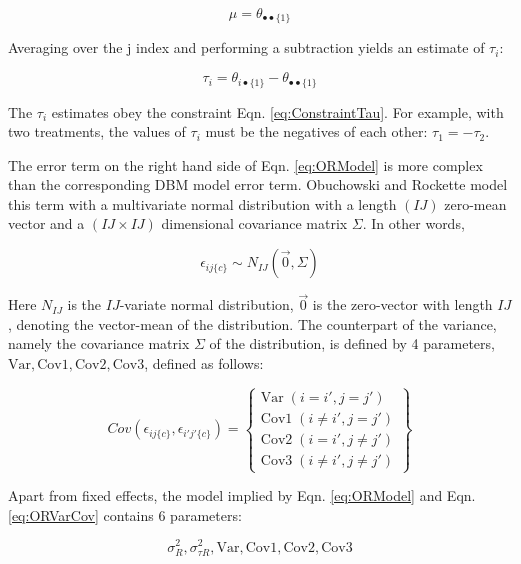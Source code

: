 \documentclass[
]{book}
\begin{document}
\begin{equation}
\mu = \theta_{\bullet \bullet \{1\}}
\label{eq:ORmuEstimate}
\end{equation}

Averaging over the j index and performing a subtraction yields an estimate of \(\tau_i\):

\begin{equation}
\tau_i = \theta_{i \bullet \{1\}} - \theta_{\bullet \bullet \{1\}}
\label{eq:ORtauEstimate}
\end{equation}

The \(\tau_i\) estimates obey the constraint Eqn. \eqref{eq:ConstraintTau}. For example, with two treatments, the values of \(\tau_i\) must be the negatives of each other: \(\tau_1=-\tau_2\).

The error term on the right hand side of Eqn. \eqref{eq:ORModel} is more complex than the corresponding DBM model error term. Obuchowski and Rockette model this term with a multivariate normal distribution with a length \((IJ)\) zero-mean vector and a \((IJ \times IJ)\) dimensional covariance matrix \(\Sigma\). In other words,

\begin{equation}
\epsilon_{ij\{c\}} \sim N_{IJ}(\vec{0},\Sigma)
\label{eq:OREpsSampling}
\end{equation}

Here \(N_{IJ}\) is the \(IJ\)-variate normal distribution, \(\vec{0}\) is the zero-vector with length \(IJ\), denoting the vector-mean of the distribution. The counterpart of the variance, namely the covariance matrix \(\Sigma\) of the distribution, is defined by 4 parameters, \(\text{Var}, \text{Cov1}, \text{Cov2}, \text{Cov3}\), defined as follows:

\begin{equation}
Cov(\epsilon_{ij\{c\}},\epsilon_{i'j'\{c\}}) =
\left\{\begin{matrix}
\text{Var} \; (i=i',j=j') \\
\text{Cov1} \; (i\ne i',j=j')\\ 
\text{Cov2} \; (i = i',j \ne j')\\ 
\text{Cov3} \; (i\ne i',j \ne j')
\end{matrix}\right\}
\label{eq:ORVarCov}
\end{equation}

Apart from fixed effects, the model implied by Eqn. \eqref{eq:ORModel} and Eqn. \eqref{eq:ORVarCov} contains 6 parameters:

\[\sigma_R^2,\sigma_{\tau R}^2,\text{Var}, \text{Cov1}, \text{Cov2}, \text{Cov3}\]
\end{document}
